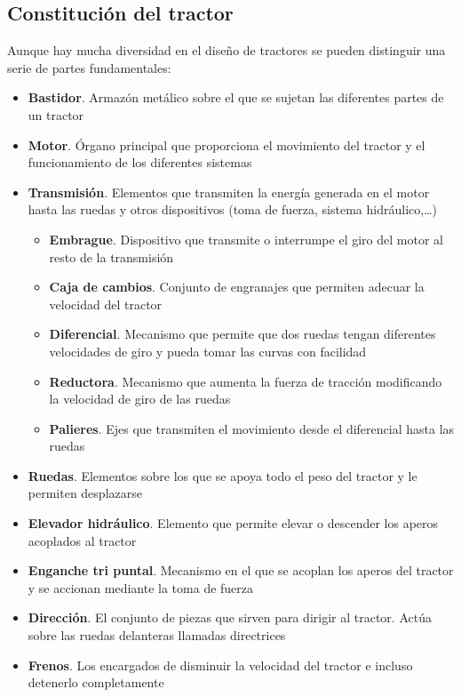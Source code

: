 \documentclass[a4paper,12pt,oneside]{article}
\begin{document}
\subsection{Constitución del tractor}
\label{sec:org10da097}
Aunque hay mucha diversidad en el diseño de tractores se pueden distinguir una
serie de partes fundamentales:
\begin{itemize}
\item \textbf{Bastidor}. Armazón metálico sobre el que se sujetan las diferentes partes de
un tractor
\item \textbf{Motor}. Órgano principal que proporciona el movimiento del tractor y el
funcionamiento de los diferentes sistemas
\item \textbf{Transmisión}. Elementos que transmiten la energía generada en el motor hasta
las ruedas y otros dispositivos (toma de fuerza, sistema hidráulico,\ldots{})
\begin{itemize}
\item \textbf{Embrague}. Dispositivo que transmite o interrumpe el giro del motor al
resto de la transmisión
\item \textbf{Caja de cambios}. Conjunto de engranajes que permiten adecuar la velocidad
del tractor
\item \textbf{Diferencial}. Mecanismo que permite que dos ruedas tengan diferentes
velocidades de giro y pueda tomar las curvas con facilidad
\item \textbf{Reductora}. Mecanismo que aumenta la fuerza de tracción modificando la
velocidad de giro de las ruedas
\item \textbf{Palieres}. Ejes que transmiten el movimiento desde el diferencial hasta las ruedas
\end{itemize}
\item \textbf{Ruedas}. Elementos sobre los que se apoya todo el peso del tractor y le
permiten desplazarse
\item \textbf{Elevador hidráulico}. Elemento que permite elevar o descender los aperos
acoplados al tractor
\item \textbf{Enganche tri puntal}. Mecanismo en el que se acoplan los aperos del tractor
y se accionan mediante la toma de fuerza
\item \textbf{Dirección}. El conjunto de piezas que sirven para dirigir al tractor. Actúa
sobre las ruedas delanteras llamadas directrices
\item \textbf{Frenos}. Los encargados de disminuir la velocidad del tractor e incluso
detenerlo completamente
\end{itemize}
\end{document}
